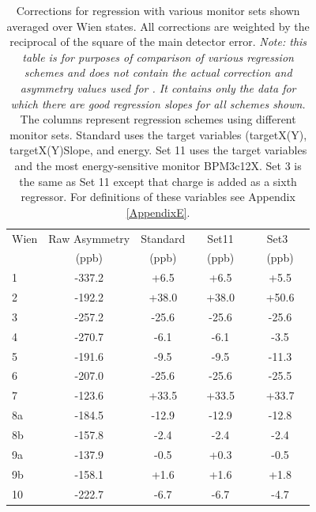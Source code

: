 \begin{table}[h]
\caption{Corrections for regression with various monitor sets shown averaged over Wien states. All corrections are weighted by the reciprocal of the square of the main detector error. {\it Note: this table is for purposes of comparison of various regression schemes and does not contain the actual correction and asymmetry values used for \Q. It contains only the data for which there are good regression slopes for all schemes shown.} The columns represent regression schemes using different monitor sets. Standard uses the target variables (targetX(Y), targetX(Y)Slope, and energy. Set 11 uses the target variables and the most energy-sensitive monitor BPM3c12X. Set 3 is the same as Set 11 except that charge is added as a sixth regressor. For definitions of these variables see Appendix \ref{AppendixE}.}
\begin{center}
\begin{tabular}[ht]{|l|c|c|c|c|}\hline
Wien & Raw Asymmetry & Standard &~~Set11~~&~~Set3~~~\\
~ & (ppb) & (ppb) & (ppb) & (ppb) \\\hline
  1  & -337.2 & +6.5  & +6.5 & +5.5 \\\hline
  2  & -192.2 & +38.0 & +38.0 & +50.6 \\\hline
  3  & -257.2 & -25.6 & -25.6 & -25.6 \\\hline
  4  & -270.7 & -6.1  & -6.1 & -3.5 \\\hline
  5  & -191.6 & -9.5  & -9.5 & -11.3 \\\hline
  6  & -207.0 & -25.6 & -25.6 & -25.5 \\\hline
  7  & -123.6 & +33.5 & +33.5 & +33.7 \\\hline
  8a & -184.5 & -12.9 & -12.9 & -12.8 \\\hline
  8b & -157.8 & -2.4  & -2.4 & -2.4 \\\hline
  9a & -137.9 & -0.5  & +0.3 & -0.5 \\\hline
  9b & -158.1 & +1.6  & +1.6 & +1.8 \\\hline
  10 & -222.7 & -6.7  & -6.7 & -4.7 \\\hline
\end{tabular}
\end{center}
\label{tab:regression_corrections_table}
\end{table}


